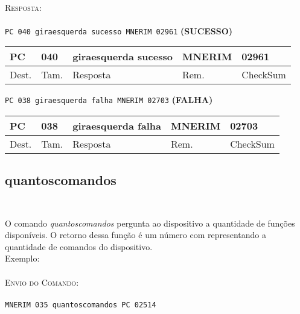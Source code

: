 \documentclass[11pt,	 papera4]{article}
\begin{document}
\paragraph*{\newline\newline}
\hspace*{0.8cm}\textsc{Resposta:} \\\\ \hspace*{2cm}\texttt{PC 040 giraesquerda sucesso MNERIM 02961} \hspace*{2cm}\textbf{(SUCESSO)}

\begin{table}[h]
	\centering
	\begin{tabular}{p{1cm}p{1cm}p{3.5cm}p{2cm}p{2cm}}
		\toprule
		PC & 040 &giraesquerda sucesso  & MNERIM & 02961 \\
		\midrule	
		Dest. & Tam. & Resposta & Rem. & CheckSum \\
		\bottomrule
	\end{tabular}
	\label{tab:formatoslatex} %
\end{table}

\hspace*{1.2cm} \texttt{PC 038 giraesquerda falha MNERIM 02703} \hspace*{2.5cm}\textbf{(FALHA)}

\begin{table}[h]
	\centering
	\begin{tabular}{p{1cm}p{1cm}p{3.5cm}p{2cm}p{2cm}}
		\toprule
		PC & 038 &giraesquerda falha  & MNERIM & 02703 \\
		\midrule	
		Dest. & Tam. & Resposta & Rem. & CheckSum \\
		\bottomrule
	\end{tabular}
	\label{tab:formatoslatex} %
\end{table}

\newpage

\subsection*{quantoscomandos \\\\}
O comando \textit{quantoscomandos} pergunta ao dispositivo a quantidade de funções disponíveis. O retorno dessa função é um número com representando a quantidade de comandos do dispositivo.\\
\newline
Exemplo:\\\\ \hspace*{0.5cm} 
\textsc{Envio do Comando:} \\\\ \hspace*{2cm} \texttt{MNERIM 035 quantoscomandos PC 02514} \\
\end{document}
